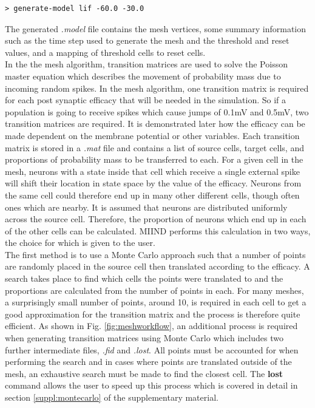 \documentclass[utf8]{frontiersSCNS} %
\begin{document}
\begin{lstlisting}[language=xml,caption={Generate a Model in the CLI}]
> generate-model lif -60.0 -30.0
\end{lstlisting}

The generated \textit{.model} file contains the mesh vertices, some summary information such as the time step used to generate the mesh and the threshold and reset values, and a mapping of threshold cells to reset cells.\\

In the the mesh algorithm, transition matrices are used to solve the Poisson master equation which describes the movement of probability mass due to incoming random spikes. In the mesh algorithm, one transition matrix is required for each post synaptic efficacy that will be needed in the simulation. So if a population is going to receive spikes which cause jumps of 0.1mV and 0.5mV, two transition matrices are required. It is demonstrated later how the efficacy can be made dependent on the membrane potential or other variables. Each transition matrix is stored in a \textit{.mat} file and contains a list of source cells, target cells, and proportions of probability mass to be transferred to each. For a given cell in the mesh, neurons with a state inside that cell which receive a single external spike will shift their location in state space by the value of the efficacy. Neurons from the same cell could therefore end up in many other different cells, though often ones which are nearby. It is assumed that neurons are distributed uniformly across the source cell. Therefore, the proportion of neurons which end up in each of the other cells can be calculated. MIIND performs this calculation in two ways, the choice for which is given to the user.\\

The first method is to use a Monte Carlo approach such that a number of points are randomly placed in the source cell then translated according to the efficacy. A search takes place to find which cells the points were translated to and the proportions are calculated from the number of points in each. For many meshes, a surprisingly small number of points, around 10, is required in each cell to get a good approximation for the transition matrix and the process is therefore quite efficient. As shown in Fig. \ref{fig:meshworkflow}, an additional process is required when generating transition matrices using Monte Carlo which includes two further intermediate files, \textit{.fid} and \textit{.lost}. All points must be accounted for when performing the search and in cases where points are translated outside of the mesh, an exhaustive search must be made to find the closest cell. The \textbf{lost} command allows the user to speed up this process which is covered in detail in section \ref{suppl:montecarlo} of the supplementary material.\\
\end{document}
